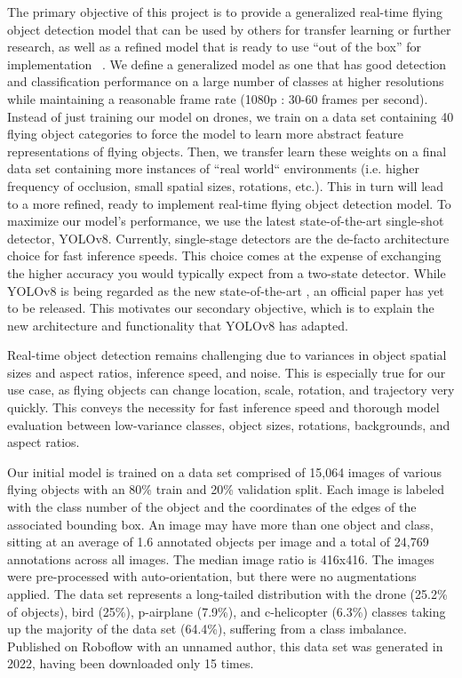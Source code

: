 \documentclass[10pt,twocolumn,letterpaper]{article}
\begin{document}
\indent The primary objective of this project is to provide a generalized real-time flying object detection model that can be used by others for transfer learning or further research, as well as a refined model that is ready to use ``out of the box'' for implementation ~\cite{OURCODE}. We define a generalized model as one that has good detection and classification performance on a large number of classes at higher resolutions while maintaining a reasonable frame rate (1080p : 30-60 frames per second). Instead of just training our model on drones, we train on a data set containing 40 flying object categories to force the model to learn more abstract feature representations of flying objects. Then, we transfer learn these weights on a final data set containing more instances of ``real world`` environments (i.e. higher frequency of occlusion, small spatial sizes, rotations, etc.). This in turn will lead to a more refined, ready to implement real-time flying object detection model. To maximize our model's performance, we use the latest state-of-the-art single-shot detector, YOLOv8. Currently, single-stage detectors are the de-facto architecture choice for fast inference speeds. This choice comes at the expense of exchanging the higher accuracy you would typically expect from a two-state detector. While YOLOv8 is being regarded as the new state-of-the-art \cite{YOLOv8Website}, an official paper has yet to be released. This motivates our secondary objective, which is to explain the new architecture and functionality that YOLOv8 has adapted. 

Real-time object detection remains challenging due to variances in object spatial sizes and aspect ratios, inference speed, and noise. This is especially true for our use case, as flying objects can change location, scale, rotation, and trajectory very quickly. This conveys the necessity for fast inference speed and thorough model evaluation between low-variance classes, object sizes, rotations, backgrounds, and aspect ratios.

Our initial model is trained on a data set \cite{InitialDataset} comprised of 15,064 images of various flying objects with an 80\% train and 20\% validation split. Each image is labeled with the class number of the object and the coordinates of the edges of the associated bounding box. An image may have more than one object and class, sitting at an average of 1.6 annotated objects per image and a total of 24,769 annotations across all images. The median image ratio is 416x416. The images were pre-processed with auto-orientation, but there were no augmentations applied. The data set represents a long-tailed distribution with the drone (25.2\% of objects), bird (25\%), p-airplane (7.9\%), and c-helicopter (6.3\%) classes taking up the majority of the data set (64.4\%), suffering from a class imbalance. Published on Roboflow with an unnamed author, this data set was generated in 2022, having been downloaded only 15 times.
\end{document}
